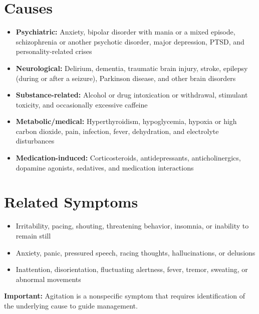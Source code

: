 \section*{Causes}
\begin{itemize}
 \item \textbf{Psychiatric:} Anxiety, bipolar disorder with mania or a mixed episode, schizophrenia or another psychotic disorder, major depression, PTSD, and personality-related crises
 \item \textbf{Neurological:} Delirium, dementia, traumatic brain injury, stroke, epilepsy (during or after a seizure), Parkinson disease, and other brain disorders
 \item \textbf{Substance-related:} Alcohol or drug intoxication or withdrawal, stimulant toxicity, and occasionally excessive caffeine
 \item \textbf{Metabolic/medical:} Hyperthyroidism, hypoglycemia, hypoxia or high carbon dioxide, pain, infection, fever, dehydration, and electrolyte disturbances
 \item \textbf{Medication-induced:} Corticosteroids, antidepressants, anticholinergics, dopamine agonists, sedatives, and medication interactions
\end{itemize}

\section*{Related Symptoms}
\begin{itemize}
 \item Irritability, pacing, shouting, threatening behavior, insomnia, or inability to remain still
 \item Anxiety, panic, pressured speech, racing thoughts, hallucinations, or delusions
 \item Inattention, disorientation, fluctuating alertness, fever, tremor, sweating, or abnormal movements
\end{itemize}
\textbf{Important:} Agitation is a nonspecific symptom that requires identification of the underlying cause to guide management.

